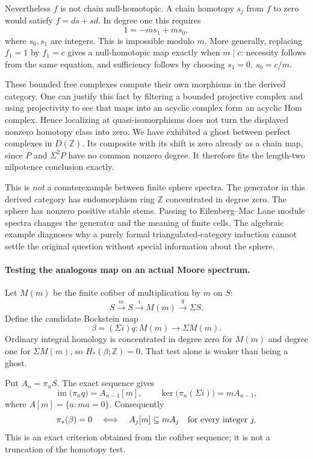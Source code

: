 \documentclass[11pt]{article}
\begin{document}
Nevertheless $f$ is not chain null-homotopic. A chain homotopy $s_j$ from
$f$ to zero would satisfy $f=ds+sd$. In degree one this requires
\begin{equation}\label{a482:homotopy}
                         1=-m s_1+m s_0,
\end{equation}
where $s_0,s_1$ are integers. This is impossible modulo $m$.
More generally, replacing $f_1=1$ by $f_1=c$ gives a null-homotopic
map exactly when $m\mid c$: necessity follows from the same equation,
and sufficiency follows by choosing $s_1=0$, $s_0=c/m$.

These bounded free complexes compute their own morphisms in the derived
category. One can justify this fact by filtering a bounded projective
complex and using projectivity to see that maps into an acyclic complex
form an acyclic Hom complex. Hence localizing at quasi-isomorphisms
does not turn the displayed nonzero homotopy class into zero. We have
exhibited a ghost between perfect complexes in $D(\mathbb Z)$.
Its composite with its shift is zero already as a chain map, since
$P$ and $\Sigma^2P$ have no common nonzero degree. It therefore fits
the length-two nilpotence conclusion exactly.

This is \emph{not} a counterexample between finite sphere spectra.
The generator in this derived category has endomorphism ring $\mathbb Z$
concentrated in degree zero. The sphere has nonzero positive stable stems.
Passing to Eilenberg--Mac Lane module spectra changes the generator and
the meaning of finite cells. The algebraic example diagnoses why a
purely formal triangulated-category induction cannot settle the original
question without special information about the sphere.

\paragraph{Testing the analogous map on an actual Moore spectrum.}
Let $M(m)$ be the finite cofiber of multiplication by $m$ on $S$:
\[
 S\xrightarrow{m}S\xrightarrow{i}M(m)\xrightarrow{q}\Sigma S.
\]
Define the candidate Bockstein map
\begin{equation}\label{a482:bockstein}
              \beta=(\Sigma i)q:M(m)\longrightarrow\Sigma M(m).
\end{equation}
Ordinary integral homology is concentrated in degree zero for $M(m)$
and degree one for $\Sigma M(m)$, so $H_*(\beta;\mathbb Z)=0$.
That test alone is weaker than being a ghost.

Put $A_n=\pi_nS$. The exact sequence gives
\[
 \operatorname{im}\bigl(\pi_nq\bigr)=A_{n-1}[m],\qquad
 \ker\bigl(\pi_n(\Sigma i)\bigr)=mA_{n-1},
\]
where $A[m]=\{a:ma=0\}$. Consequently
\begin{equation}\label{a482:criterion}
 \pi_*(\beta)=0
 \quad\Longleftrightarrow\quad
 A_j[m]\subseteq mA_j\quad\hbox{for every integer }j.
\end{equation}
This is an exact criterion obtained from the cofiber sequence; it is
not a truncation of the homotopy test.
\end{document}
